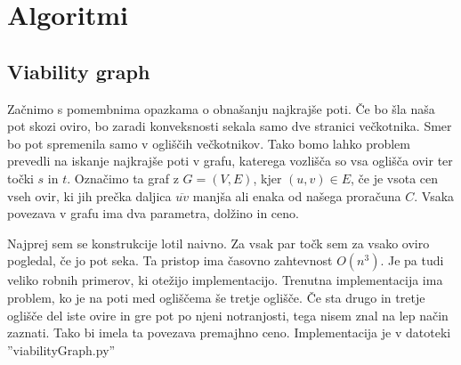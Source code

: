 \documentclass{article}
\begin{document}

\section*{Algoritmi}

\subsection*{Viability graph}

Začnimo s pomembnima opazkama o obnašanju najkrajše poti. Če bo šla naša pot skozi oviro, bo zaradi konveksnosti sekala samo dve stranici večkotnika. Smer bo pot spremenila samo v ogliščih večkotnikov. Tako bomo lahko problem prevedli na iskanje najkrajše poti v grafu, katerega vozlišča so vsa oglišča ovir ter točki $s$ in $t$. Označimo ta graf z $G = (V, E)$, kjer $(u,v) \in E$, če je vsota cen vseh ovir, ki jih prečka daljica $\overline{uv}$ manjša ali enaka od našega proračuna $C$. Vsaka povezava v grafu ima dva parametra, dolžino in ceno. 

Najprej sem se konstrukcije lotil naivno. Za vsak par točk sem za vsako oviro pogledal, če jo pot seka. Ta pristop ima časovno zahtevnost $O(n^3)$. Je pa tudi veliko robnih primerov, ki otežijo implementacijo. Trenutna implementacija ima problem, ko je na poti med ogliščema še tretje oglišče. Če sta drugo in tretje oglišče del iste ovire in gre pot po njeni notranjosti, tega nisem znal na lep način zaznati. Tako bi imela ta povezava premajhno ceno. Implementacija je v datoteki ''viabilityGraph.py''
\end{document}
